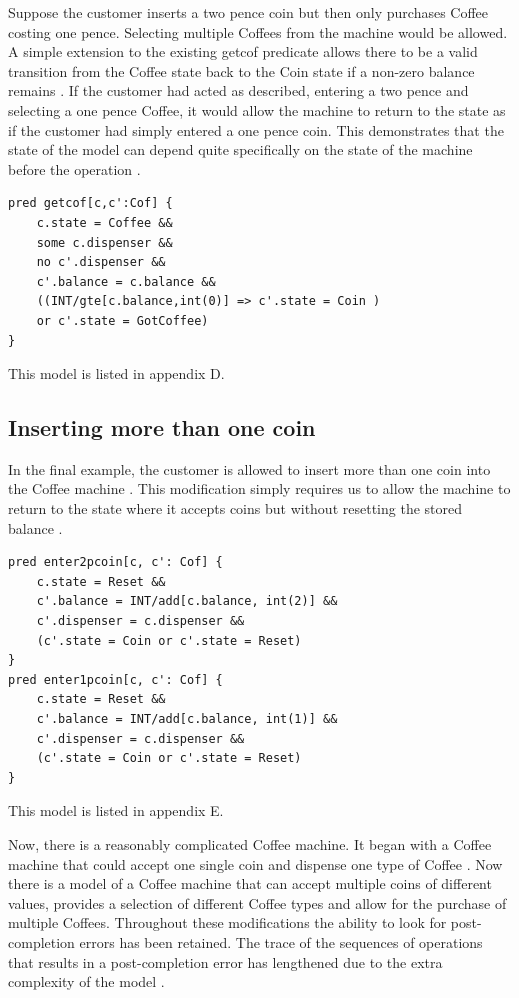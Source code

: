 \documentclass[a4paper,10pt]{report}
\begin{document}
Suppose the customer inserts a two pence coin but then only purchases Coffee costing one pence. Selecting multiple Coffees from the machine would be allowed. A simple extension to the existing getcof predicate allows there to be a valid transition from the Coffee state back to the Coin state if a non-zero balance remains \cite{Boyatt}. If the customer had acted as described, entering a two pence and selecting a one pence Coffee, it would allow the machine to return to the state as if the customer had simply entered a one pence coin. This demonstrates that the state of the model can depend quite specifically on the state of the machine before the operation \cite{Boyatt}.

\begin{verbatim}
pred getcof[c,c':Cof] {
	c.state = Coffee &&
	some c.dispenser &&
	no c'.dispenser &&
	c'.balance = c.balance &&
	((INT/gte[c.balance,int(0)] => c'.state = Coin )
	or c'.state = GotCoffee)
}
\end{verbatim}

This model is listed in appendix D.

\subsection{Inserting more than one coin}
\label{Inserting more than one coin}

In the final example, the customer is allowed to insert more than one coin into the Coffee machine \cite{Boyatt}. This modification simply requires us to allow the machine to return to the state where it accepts coins but without resetting the stored balance \cite{Boyatt}.

\begin{verbatim}
pred enter2pcoin[c, c': Cof] {
	c.state = Reset &&
	c'.balance = INT/add[c.balance, int(2)] &&
	c'.dispenser = c.dispenser &&
	(c'.state = Coin or c'.state = Reset)
}
pred enter1pcoin[c, c': Cof] {
	c.state = Reset &&
	c'.balance = INT/add[c.balance, int(1)] &&
	c'.dispenser = c.dispenser &&
	(c'.state = Coin or c'.state = Reset)
}
\end{verbatim}

This model is listed in appendix E.

Now, there is a reasonably complicated Coffee machine. It began with a Coffee machine that could accept one single coin and dispense one type of Coffee \cite{Boyatt}. Now there is a model of a Coffee machine that can accept multiple coins of different values, provides a selection of different Coffee types and allow for the purchase of multiple Coffees. Throughout these modifications the ability to look for post-completion errors has been retained. The trace of the sequences of operations that results in a post-completion error has lengthened due to the extra complexity of the model \cite{Boyatt}.
 
\end{document}

